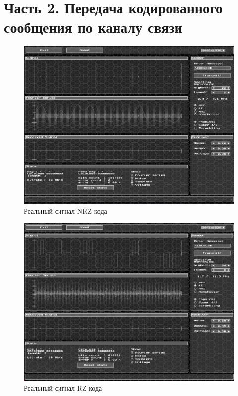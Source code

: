\documentclass[12pt,onecolumn]{article}
\begin{document}
\section{Часть 2. Передача кодированного сообщения по каналу связи}
\begin{figure}[H]
    \centering
    \includegraphics[width=\textwidth]{image/nf-1.png}
    \caption{Реальный сигнал NRZ кода}
\end{figure}
\begin{figure}[H]
    \centering
    \includegraphics[width=\textwidth]{image/nf-2.png}
    \caption{Реальный сигнал RZ кода}
\end{figure}
\end{document}
